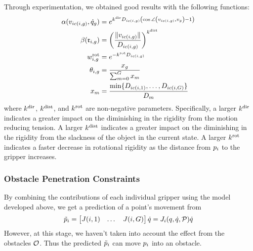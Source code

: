 Through experimentation, we obtained good results with the following functions:
\begin{equation}
\begin{split}
    \alpha(v_{i c(i, g)}, \dot{q}_g)  &= e^{k^\textrm{dir} D_{i c(i, g)} \left(\cos \angle \left( v_{i c(i, g)}, v_g \right) - 1\right)} \\
    \beta(\mathfrak{r}_{i, g})    &= \left( \frac{\| v_{i c(i, g)} \|}{D_{i c(i, g)}} \right) ^{k^\textrm{dist}} \\
    w^{\textrm{rot}}_{i, g}  &= e^{-k^{\textrm{rot}} D_{i c(i, g)}} \\
    \theta_{i, g}    &= \frac{x_g}{\sum_{m = 0}^G x_m}\\
    x_m             &= \frac{\textrm{min} \{D_{i c(i, 1)}, \dots , D_{i c(i, G)}\}}{D_m} 
\end{split}
\label{eq:directional_rigidity_factors}
\end{equation}
where $k^\textrm{dir}$, $k^\textrm{dist}$, and $k^{\textrm{rot}}$ are non-negative parameters. Specifically, a larger $k^\textrm{dir}$ indicates a greater impact on the diminishing in the rigidity from the motion reducing tension. A larger $k^\textrm{dist}$ indicates a greater impact on the diminishing in the rigidity from the slackness of the object in the current state. A larger $k^{\textrm{rot}}$ indicates a faster decrease in rotational rigidity as the distance from $p_i$ to the gripper increases. 

\subsubsection{Obstacle Penetration Constraints}

By combining the contributions of each individual gripper using the model developed above, we get a prediction of a point's movement from
\begin{equation}
    \tilde{p}_i = \begin{bmatrix}
        J(i, 1) & \dots & 
        J(i, G)
    \end{bmatrix} \dot{q} = J_{i}(q, \dot{q}, \mathcal{P}) \dot{q}
\end{equation}
However, at this stage, we haven't taken into account the effect from the obstacles $\mathcal{O}$. Thus the predicted $\tilde{p}_i$ can move $p_i$ into an obstacle.

